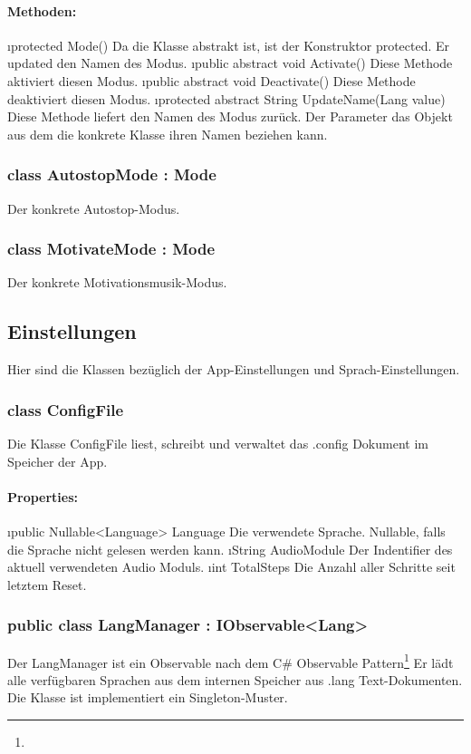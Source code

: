 \documentclass[../entwurf.tex]{subfiles}
\begin{document}
				\paragraph{Methoden:}
					\begin{itemize}
						\i{protected Mode()} Da die Klasse abstrakt ist, ist der Konstruktor protected. Er updated den Namen des Modus.
						\i{public abstract void Activate()} Diese Methode aktiviert diesen Modus.
						\i{public abstract void Deactivate()} Diese Methode deaktiviert diesen Modus.
						\i{protected abstract String UpdateName(Lang value)}  Diese Methode liefert den Namen des Modus zurück. Der Parameter das
						Objekt aus dem die konkrete Klasse ihren Namen beziehen kann.
					\end{itemize}
			\subsubsection{class AutostopMode : Mode}
				Der konkrete Autostop-Modus.
			\subsubsection{class MotivateMode : Mode}
				Der konkrete Motivationsmusik-Modus.
		\subsection{Einstellungen}
			Hier sind die Klassen bezüglich der App-Einstellungen und Sprach-Einstellungen.
			\subsubsection{class ConfigFile}
				Die Klasse ConfigFile liest, schreibt und verwaltet das .config Dokument im Speicher der App.
				\paragraph{Properties:}
					\begin{itemize}
						\i{public Nullable<Language> Language} Die verwendete Sprache. Nullable, falls die Sprache nicht gelesen werden kann.
						\i{String AudioModule} Der Indentifier des aktuell verwendeten Audio Moduls.
						\i{int TotalSteps} Die Anzahl aller Schritte seit letztem Reset.
					\end{itemize}
			\subsubsection{public class LangManager : IObservable<Lang>}
				Der LangManager ist ein Observable nach dem C\# Observable Pattern\footnote{}
				Er lädt alle verfügbaren Sprachen aus dem internen Speicher aus .lang Text-Dokumenten.
				Die Klasse ist implementiert ein Singleton-Muster.
\end{document}
